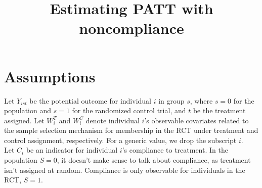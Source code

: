 \documentclass{article}
\title{Estimating PATT with noncompliance}
\begin{document}
\maketitle


\section{Assumptions}
Let $Y_{ist}$ be the potential outcome for individual $i$ in group $s$, where $s=0$ for the population and $s=1$ for the randomized control trial, and $t$ be the treatment assigned.  Let $W_i^T$ and $W_i^C$ denote individual $i$'s observable covariates related to the sample selection mechanism for membership in the RCT under treatment and control assignment, respectively.  For a generic value, we drop the subscript $i$.  \\

Let $C_i$ be an indicator for individual $i$'s compliance to treatment.  In the population $S=0$, it doesn't make sense to talk about compliance, as treatment isn't assigned at random.  Compliance is only observable for individuals in the RCT, $S=1$.
\end{document}

